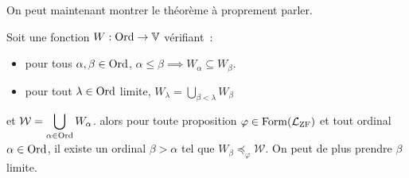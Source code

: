 On peut maintenant montrer le théorème à proprement parler.

\begin{theorem}[Réflexion]\label{thm.reflexion}
  Soit une fonction $W : \operatorname{Ord} \to \mathbb V$ vérifiant~:
  \begin{itemize}
  \item pour tous $\alpha, \beta \in \operatorname{Ord}$,
    $\alpha \leq \beta \implies W_\alpha \subseteq W_\beta$.
  \item pour tout $\lambda \in \operatorname{Ord}$ limite,
    $\displaystyle W_\lambda = \bigcup_{\beta < \lambda} W_\beta$
  \end{itemize}
  et $\displaystyle \mathcal W = \bigcup_{\alpha \in \operatorname{Ord}} W_\alpha$.
  alors pour toute proposition $\varphi\in\operatorname{Form}(\mathcal L_{\operatorname{ZF}})$ et tout
  ordinal $\alpha \in \operatorname{Ord}$, il existe un ordinal $\beta > \alpha$ tel que
  $W_\beta\preccurlyeq_\varphi \mathcal W$. On peut de plus prendre $\beta$
  limite.
\end{theorem}

